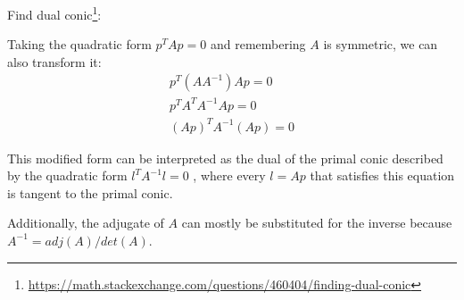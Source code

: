 Find dual conic\footnote{\url{https://math.stackexchange.com/questions/460404/finding-dual-conic}}:

Taking the quadratic form $p^TAp=0$ and remembering $A$ 
is symmetric, we can also transform it:
\begin{gather*}
  p^T(AA^{-1})Ap=0 \\
  p^TA^TA^{-1}Ap=0 \\
  (Ap)^TA^{-1}(Ap)=0 
\end{gather*}

This modified form can be interpreted as the dual of the primal conic described by the quadratic form $l^𝑇𝐴^{−1}l=0$
, where every $l=Ap$ that satisfies this equation is tangent to the primal conic.

Additionally, the adjugate of $A$ can mostly be substituted for the inverse because $A^{-1}=adj(A)/det(A)$.